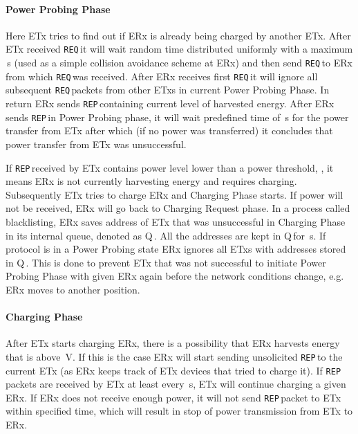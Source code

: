 \documentclass[11pt,draftclsnofoot,journal,onecolumn]{IEEEtran}
\newcommand{\textsubscript}[1]{}
\newcommand{\txTimeoutProbeReceive}{}
\newcommand{\txRandomWaitTimeMax}{}
\newcommand{\rxDelayRemoveLastProbeSender}{}
\newcommand{\rxDelayWaitingForPower}{}
\newcommand{\rxVoltageThreshold}{}
\newcommand{\chargingRequest}{\texttt{REQ\textsubscript{CRG}}\,}
\newcommand{\powerProbeReport}{\texttt{REP\textsubscript{PWR}}\,}
\newcommand{\powerProbeRequest}{\texttt{REQ\textsubscript{PWR}}\,}
\newcommand{\txAddressQueue}{Q\textsubscript{TX}\,}
\begin{document}
\paragraph{Power Probing Phase} Here ETx tries to find out if ERx is already being charged by another ETx. After ETx received \chargingRequest it will wait random time distributed uniformly with a maximum \txRandomWaitTimeMax\,s (used as a simple collision avoidance scheme at ERx) and then send \powerProbeRequest to ERx from which \chargingRequest was received. After ERx receives first \powerProbeRequest it will ignore all subsequent \powerProbeRequest packets from other ETxs in current Power Probing Phase. In return ERx sends \powerProbeReport containing current level of harvested energy. After ERx sends \powerProbeReport in Power Probing phase, it will wait predefined time of \rxDelayWaitingForPower\,s for the power transfer from ETx after which (if no power was transferred) it concludes that power transfer from ETx was unsuccessful.

If \powerProbeReport received by ETx contains power level lower than a power threshold, \rxVoltageThreshold, it means ERx is not currently harvesting energy and requires charging. Subsequently ETx tries to charge ERx and Charging Phase starts. If power will not be received, ERx will go back to Charging Request phase. In a process called blacklisting, ERx saves address of ETx that was unsuccessful in Charging Phase in its internal queue, denoted as \txAddressQueue. All the addresses are kept in \txAddressQueue for \rxDelayRemoveLastProbeSender\,s. If protocol is in a Power Probing state ERx ignores all ETxs with addresses stored in \txAddressQueue. This is done to prevent ETx that was not successful to initiate Power Probing Phase with given ERx again before the network conditions change, e.g. ERx moves to another position.

\paragraph{Charging Phase} After ETx starts charging ERx, there is a possibility that ERx harvests energy that is above \rxVoltageThreshold\,V. If this is the case ERx will start sending unsolicited \powerProbeReport to the current ETx (as ERx keeps track of ETx devices that tried to charge it). If \powerProbeReport packets are received by ETx at least every \txTimeoutProbeReceive\,s, ETx will continue charging a given ERx. If ERx does not receive enough power, it will not send \powerProbeReport packet to ETx within specified time, which will result in stop of power transmission from ETx to ERx.
\end{document}
